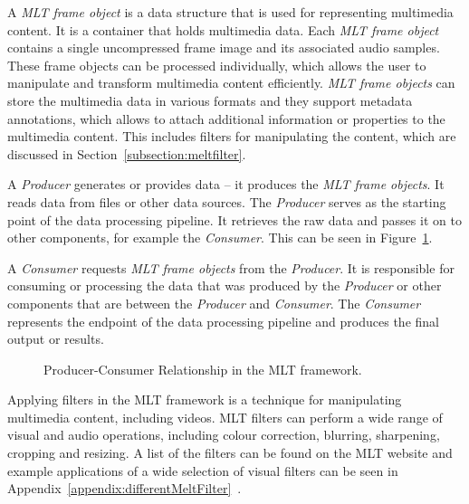 \documentclass[../MasterThesis.tex]{subfiles}
\begin{document}
A \textit{MLT frame object} is a data structure that is used for representing multimedia content. 
It is a container that holds multimedia data. Each \textit{MLT frame object} contains a single uncompressed frame image and its associated audio samples. These frame objects can be processed individually, which allows the user to manipulate and transform multimedia content efficiently.
\textit{MLT frame objects} can store the multimedia data in various formats and they support metadata annotations, which allows to attach additional information or properties to the multimedia content. This includes filters for manipulating the content, which are discussed in Section~\ref{subsection:meltfilter}.


A \textit{Producer} generates or provides data -- it produces the \textit{MLT frame objects}. 
It reads data from files or other data sources. The \textit{Producer} serves as the starting point of the data processing pipeline. It retrieves the raw data and passes it on to other components, for example the \textit{Consumer}. This can be seen in Figure~\ref{fig:producer_consumer}.

A \textit{Consumer} requests \textit{MLT frame objects} from the \textit{Producer}.
It is responsible for consuming or processing the data that was produced by the \textit{Producer} or other components that are between the \textit{Producer} and \textit{Consumer}. 
The \textit{Consumer} represents the endpoint of the data processing pipeline and produces the final output or results.



\begin{figure}[H]
	\centering
	\caption{Producer-Consumer Relationship in the MLT framework.}
	\label{fig:producer_consumer}
\end{figure}

Applying filters in the MLT framework is a technique for manipulating multimedia content, including videos. 
MLT filters can perform a wide range of visual and audio operations, including colour correction, blurring, sharpening, cropping and resizing. A list of the filters can be found on the MLT website and example applications of a wide selection of visual filters can be seen in Appendix~\ref{appendix:differentMeltFilter}~\cite{melt_filters}.
\end{document}

